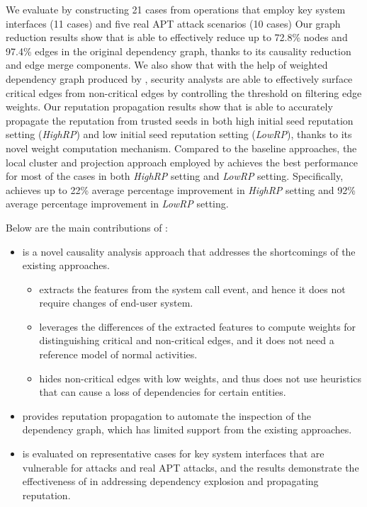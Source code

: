 We evaluate \tool by constructing 21 cases from operations that employ key system interfaces (11 cases) and five real APT attack scenarios (10 cases)
Our graph reduction results show that \tool is able to effectively reduce up to 72.8\% nodes and 97.4\% edges in the original dependency graph, thanks to its causality reduction and edge merge components. We also show that with the help of weighted dependency graph produced by \tool, security analysts are able to effectively surface critical edges from non-critical edges by controlling the threshold on filtering edge weights.
Our reputation propagation results show that \tool is able to accurately propagate the reputation from trusted seeds in both high initial seed reputation setting (\emph{HighRP}) and low initial seed reputation setting (\emph{LowRP}), thanks to its novel weight computation mechanism.
Compared to the baseline approaches, the local cluster and projection approach employed by \tool achieves the best performance for most of the cases in both \emph{HighRP} setting and \emph{LowRP} setting. 
Specifically, \tool achieves up to 22\% average percentage improvement in \emph{HighRP} setting and 92\% average percentage improvement in \emph{LowRP} setting.




Below are the main contributions of \tool:
\begin{itemize}
\item \tool is a novel causality analysis approach that addresses the shortcomings of the existing approaches. 
    \begin{itemize}
     \item \tool extracts the features from the system call event, and hence it does not require changes of end-user system.
    \item \tool leverages the differences of the extracted features to compute weights for distinguishing critical and non-critical edges, and it does not need a reference model of normal activities.
    \item \tool hides non-critical edges with low weights, and thus does not use heuristics that can cause a loss of dependencies for certain entities.
    \end{itemize}
\item \tool provides reputation propagation to automate the inspection of the dependency graph, which has limited support from the existing approaches.
    \item \tool is evaluated on representative cases for key system interfaces that are vulnerable for attacks and real APT attacks, and the results demonstrate the effectiveness of \tool in addressing dependency explosion and propagating reputation.
\end{itemize}